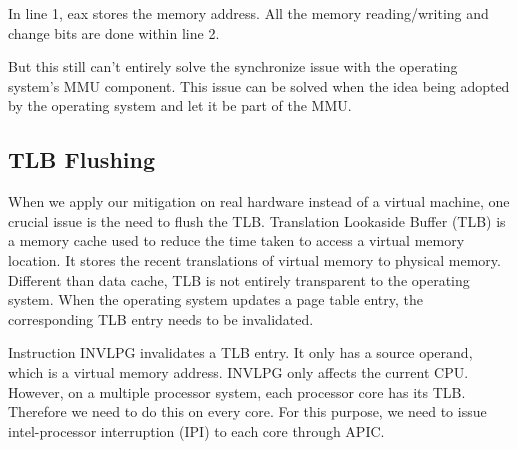 In line 1, eax stores the memory address. All the memory reading/writing and change bits are done within line 2.

But this still can't entirely solve the synchronize issue with the operating system's MMU component. This issue can be solved when the idea being adopted by the operating system and let it be part of the MMU. 

\subsection{TLB Flushing}
%
%
%
%



When we apply our mitigation on real hardware instead of a virtual machine, one crucial issue is the need to flush the TLB.  Translation Lookaside Buffer (TLB) is a memory cache used to reduce the time taken to access a virtual memory location. It stores the recent translations of virtual memory to physical memory. Different than data cache, TLB is not entirely transparent to the operating system. When the operating system updates a page table entry, the corresponding TLB entry needs to be invalidated.

Instruction INVLPG invalidates a TLB entry. It only has a source operand, which is a virtual memory address. INVLPG only affects the current CPU. However, on a multiple processor system, each processor core has its TLB. Therefore we need to do this on every core. For this purpose, we need to issue intel-processor interruption (IPI) to each core through APIC. 

